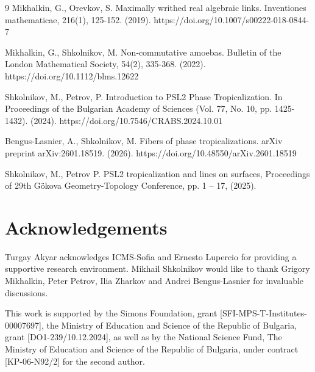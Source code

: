 \documentclass[pdflatex,sn-mathphys-num]{sn-jnl}%
\theoremstyle{thmstyleone}%
\theoremstyle{thmstyletwo}%
\theoremstyle{thmstylethree}%
\begin{document}
\begin{thebibliography}{9}
Mikhalkin, G., Orevkov, S. Maximally writhed real algebraic links. Inventiones mathematicae, 216(1), 125-152. (2019). https://doi.org/10.1007/s00222-018-0844-7

Mikhalkin, G., Shkolnikov, M. Non‐commutative amoebas. Bulletin of the London Mathematical Society, 54(2), 335-368. (2022). https://doi.org/10.1112/blms.12622

Shkolnikov, M.,  Petrov, P. Introduction to PSL2 Phase Tropicalization. In Proceedings of the Bulgarian Academy of Sciences (Vol. 77, No. 10, pp. 1425-1432). (2024). https://doi.org/10.7546/CRABS.2024.10.01

Bengu\textcommabelow s-Lasnier, A.,  Shkolnikov, M. Fibers of phase tropicalizations. arXiv preprint arXiv:2601.18519. (2026). https://doi.org/10.48550/arXiv.2601.18519

Shkolnikov, M., Petrov P. PSL2 tropicalization and lines on surfaces, Proceedings of 29th G\"okova Geometry-Topology Conference, pp. 1 – 17, (2025).

\end{thebibliography}

\section*{Acknowledgements}

Turgay Akyar acknowledges ICMS-Sofia and Ernesto Lupercio for providing a supportive research environment. Mikhail Shkolnikov would like to thank Grigory Mikhalkin, Peter Petrov, Ilia Zharkov and Andrei Bengu\textcommabelow s-Lasnier for invaluable discussions.


This work is supported by the Simons Foundation, grant [SFI-MPS-T-Institutes-00007697],
the Ministry of Education and Science of the Republic of Bulgaria,
grant [DO1-239/10.12.2024], as well as by the National Science Fund,
The Ministry of Education and Science of the Republic of Bulgaria, under contract [KP-06-N92/2] for the second author.
\end{document}
